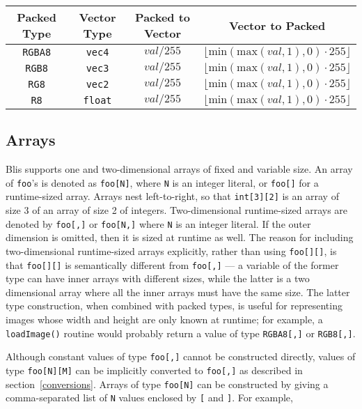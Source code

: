 \documentclass[11pt]{article}
\newcommand{\code}[1]{\texttt{#1}}
\begin{document}
\vspace{3mm}

\begin{tabular}{| c | c | c | c |}
\hline
Packed Type & Vector Type & Packed to Vector & Vector to Packed \\
\hline
\code{RGBA8} & \code{vec4} & $\textit{val} / 255$ & $ \lfloor \text{min}(\text{max}(\textit{val}, 1), 0) \cdot 255 \rfloor$ \\
\hline
\code{RGB8} & \code{vec3} & $\textit{val} / 255$ & $ \lfloor \text{min}(\text{max}(\textit{val}, 1), 0) \cdot 255 \rfloor$ \\
\hline
\code{RG8} & \code{vec2} & $\textit{val} / 255$ & $ \lfloor \text{min}(\text{max}(\textit{val}, 1), 0) \cdot 255 \rfloor$ \\
\hline
\code{R8} & \code{float} & $\textit{val} / 255$ & $ \lfloor \text{min}(\text{max}(\textit{val}, 1), 0) \cdot 255 \rfloor$ \\
\hline
\end{tabular}

\subsection{Arrays}

Blis supports one and two-dimensional arrays of fixed and variable size. An array of \code{foo}'s is denoted as \code{foo[N]}, where \code{N} is an integer literal, or \code{foo[]} for a runtime-sized array. Arrays nest left-to-right, so that \code{int[3][2]} is an array of size 3 of an array of size 2 of integers. Two-dimensional runtime-sized arrays are denoted by \code{foo[,]} or \code{foo[N,]} where \code{N} is an integer literal. If the outer dimension is omitted, then it is sized at runtime as well. The reason for including two-dimensional runtime-sized arrays explicitly, rather than using \code{foo[][]}, is that \code{foo[][]} is semantically different from \code{foo[,]} --- a variable of the former type can have inner arrays with different sizes, while the latter is a two dimensional array where all the inner arrays must have the same size. The latter type construction, when combined with packed types, is useful for representing images whose width and height are only known at runtime; for example, a \code{loadImage()} routine would probably return a value of type \code{RGBA8[,]} or \code{RGB8[,]}.

Although constant values of type \code{foo[,]} cannot be constructed directly, values of type \code{foo[N][M]} can be implicitly converted to \code{foo[,]} as described in section~\ref{conversions}. Arrays of type \code{foo[N]} can be constructed by giving a comma-separated list of \code{N} values enclosed by \code{[} and \code{]}. For example,
\end{document}
